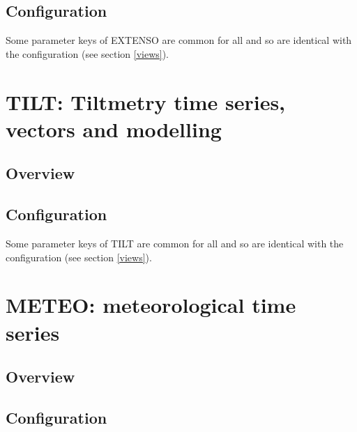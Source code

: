 \subsection{Configuration}

Some parameter keys of EXTENSO are common for all  and  so are identical with the  configuration (see section \ref{views}).




\section{TILT: Tiltmetry time series, vectors and modelling}

\subsection{Overview}

\subsection{Configuration}

Some parameter keys of TILT are common for all  and  so are identical with the  configuration (see section \ref{views}).




\section{METEO: meteorological time series}

\subsection{Overview}

\subsection{Configuration}

